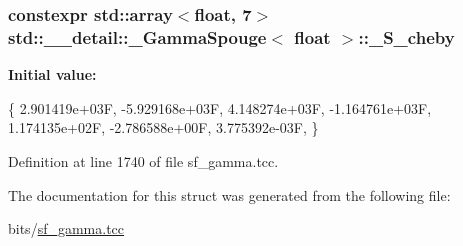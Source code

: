 \subsubsection[{\texorpdfstring{\+\_\+\+S\+\_\+cheby}{_S_cheby}}]{\setlength{\rightskip}{0pt plus 5cm}constexpr std\+::array$<$float, 7$>$ {\bf std\+::\+\_\+\+\_\+detail\+::\+\_\+\+Gamma\+Spouge}$<$ float $>$\+::\+\_\+\+S\+\_\+cheby\hspace{0.3cm}{\ttfamily [static]}}\hypertarget{structstd_1_1____detail_1_1__GammaSpouge_3_01float_01_4_a68acee4e85813ec5364a4a67f8eddeb7}{}\label{structstd_1_1____detail_1_1__GammaSpouge_3_01float_01_4_a68acee4e85813ec5364a4a67f8eddeb7}
{\bfseries Initial value\+:}
\begin{DoxyCode}
\{
    2.901419e+03F,
    -5.929168e+03F,
    4.148274e+03F,
    -1.164761e+03F,
    1.174135e+02F,
    -2.786588e+00F,
    3.775392e-03F,
      \}
\end{DoxyCode}


Definition at line 1740 of file sf\+\_\+gamma.\+tcc.



The documentation for this struct was generated from the following file\+:\begin{DoxyCompactItemize}
\item 
bits/\hyperlink{sf__gamma_8tcc}{sf\+\_\+gamma.\+tcc}\end{DoxyCompactItemize}
